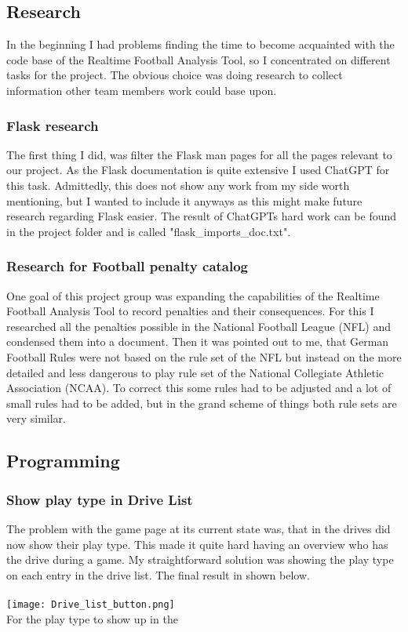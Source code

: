 \subsection{Research}				%
In the beginning I had problems finding the time to become acquainted with the code base of the Realtime Football Analysis Tool, so I concentrated on different tasks for the project. The obvious choice was doing research to collect information other team members work could base upon.

\subsubsection{Flask research}
The first thing I did, was filter the Flask man pages for all the pages relevant to our project. As the Flask documentation is quite extensive I used ChatGPT for this task. Admittedly, this does not show any work from my side worth mentioning, but I wanted to include it anyways as this might make future research regarding Flask easier. The result of ChatGPTs hard work can be found in the project folder and is called "flask\_imports\_doc.txt".

\subsubsection{Research for Football penalty catalog}
One goal of this project group was expanding the capabilities of the Realtime Football Analysis Tool to record penalties and their consequences. For this I researched all the penalties possible in the National Football League (NFL) and condensed them into a document. Then it was pointed out to me, that German Football Rules were not based on the rule set of the NFL but instead on the more detailed and less dangerous to play rule set of the National Collegiate Athletic Association (NCAA). To correct this some rules had to be adjusted and a lot of small rules had to be added, but in the grand scheme of things both rule sets are very similar. 


\subsection{Programming}
\subsubsection{Show play type in Drive List}
The problem with the game page at its current state was, that in the drives did now show their play type. This made it quite hard having an overview who has the drive during a game. My straightforward solution was showing the play type on each entry in the drive list. The final result in shown below.\\ \\
\texttt{[image: Drive\_list\_button.png]} \\
For the play type to show up in the 

